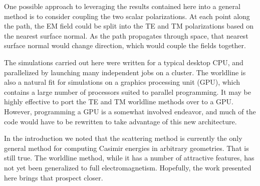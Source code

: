 One possible approach to leveraging the results contained here into a general method is to consider coupling the two 
scalar polarizations.  
At each point along the path, the EM field could be split into the TE and TM polarizations based 
on the nearest surface normal.
As the path propagates through space, that nearest surface normal would change direction, which would couple the fields 
together.  

The simulations carried out here were written for a typical desktop CPU, and parallelized by launching
many independent jobs on a cluster.  
The worldline is also a natural fit for simulations on a graphics processing unit (GPU), 
which contains a large number of processors suited to parallel programming. 
It may be highly effective to port the TE and TM worldline methods over to a GPU.
However, programming a GPU is a somewhat involved endeavor, and much of the code would have to be 
rewritten to take advantage of this new architecture.  

In the introduction we noted that the scattering method is currently the only general
method for computing Casimir energies in arbitrary geometries. That is still true.  The worldline method,
while it has a number of attractive features, has not yet been generalized to full electromagnetism.   
Hopefully, the work presented here brings that prospect closer.  


